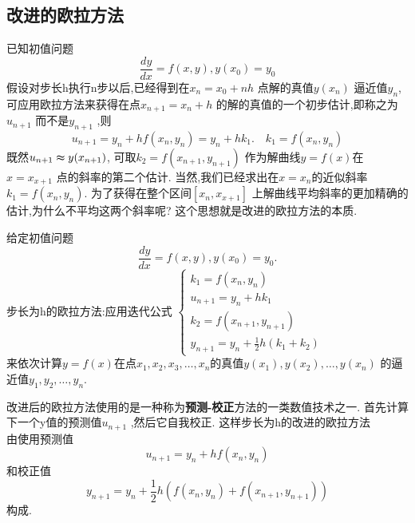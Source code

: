 \documentclass{book}
\begin{document}
\subsection{改进的欧拉方法}
已知初值问题
\begin{equation}
  \frac{dy}{dx}=f(x,y),y(x_0)=y_0
\end{equation}
假设对步长h执行n步以后,已经得到在$x_n=x_0+nh$ 点解的真值$y(x_n)$ 逼近值$y_n$,
可应用欧拉方法来获得在点$x_{n+1}=x_n+h$ 的解的真值的一个初步估计,即称之为$u_{n+1}$ 而不是$y_{n+1}$ ,则
\begin{equation}
  u_{n+1}=y_n+hf(x_n,y_n)=y_n+hk_1. \quad k_1=f(x_n,y_n)
\end{equation}
既然$u_{n+1}\thickapprox y(x_{n+1})$, 可取$k_2=f(x_{n+1},y_{n+1})$ 作为解曲线$y=f(x)$在$x=x_{x+1}$ 点的斜率的第二个估计. \newline
当然,我们已经求出在$x=x_n$的近似斜率$k_1=f(x_n,y_n)$. 为了获得在整个区间$[x_n,x_{x+1}]$ 上解曲线平均斜率的更加精确的估计,为什么不平均这两个斜率呢? \newline
这个思想就是改进的欧拉方法的本质.
\begin{theorem}[算法~~~改进的欧拉方法]
给定初值问题
\begin{equation}
  \frac{dy}{dx}=f(x,y),y(x_0)=y_0.
\end{equation}
步长为h的欧拉方法:应用迭代公式
$
\begin{cases}
  k_1=f(x_n,y_n) \\
  u_{n+1}=y_n+hk_1 \\
  k_2=f(x_{n+1},y_{n+1}) \\
  y_{n+1}=y_n+\frac{1}{2}h(k_1+k_2)
\end{cases}
$
\\
来依次计算$y=f(x)$在点$x_1,x_2,x_3,\ldots,x_n$的真值$y(x_1),y(x_2),\ldots,y(x_n)$ 的逼近值$y_1,y_2,\ldots,y_n$. 
\end{theorem}
\begin{note}
  改进后的欧拉方法使用的是一种称为{\bf 预测-校正}方法的一类数值技术之一. 首先计算下一个y值的预测值$u_{n+1}$ ,然后它自我校正. 这样步长为h的改进的欧拉方法\\
  由使用预测值
  \begin{equation}
    u_{n+1}=y_n+hf(x_n,y_n)
  \end{equation}
  和校正值
  \begin{equation}
    y_{n+1}=y_n+\frac{1}{2}h(f(x_n,y_n)+f(x_{n+1},y_{n+1}))
  \end{equation}
  构成.
\end{note}
\end{document}
